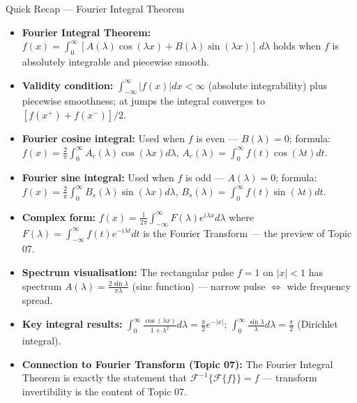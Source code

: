 \documentclass[12pt,a4paper]{article}
\begin{document}
\begin{learnbox}{Quick Recap --- Fourier Integral Theorem}
\begin{itemize}
  \item \textbf{Fourier Integral Theorem:} $f(x)=\int_0^\infty[A(\lambda)\cos(\lambda x)+B(\lambda)\sin(\lambda x)]\,d\lambda$ holds when $f$ is absolutely integrable and piecewise smooth.
  \item \textbf{Validity condition:} $\int_{-\infty}^\infty|f(x)|dx<\infty$ (absolute integrability) plus piecewise smoothness; at jumps the integral converges to $[f(x^+)+f(x^-)]/2$.
  \item \textbf{Fourier cosine integral:} Used when $f$ is even --- $B(\lambda)=0$; formula: $f(x)=\frac{2}{\pi}\int_0^\infty A_c(\lambda)\cos(\lambda x)d\lambda$, $A_c(\lambda)=\int_0^\infty f(t)\cos(\lambda t)dt$.
  \item \textbf{Fourier sine integral:} Used when $f$ is odd --- $A(\lambda)=0$; formula: $f(x)=\frac{2}{\pi}\int_0^\infty B_s(\lambda)\sin(\lambda x)d\lambda$, $B_s(\lambda)=\int_0^\infty f(t)\sin(\lambda t)dt$.
  \item \textbf{Complex form:} $f(x)=\frac{1}{2\pi}\int_{-\infty}^\infty F(\lambda)e^{i\lambda x}d\lambda$ where $F(\lambda)=\int_{-\infty}^\infty f(t)e^{-i\lambda t}dt$ is the Fourier Transform --- the preview of Topic 07.
  \item \textbf{Spectrum visualisation:} The rectangular pulse $f=1$ on $|x|<1$ has spectrum $A(\lambda)=\frac{2\sin\lambda}{\pi\lambda}$ (sinc function) --- narrow pulse $\Leftrightarrow$ wide frequency spread.
  \item \textbf{Key integral results:} $\int_0^\infty\frac{\cos(\lambda x)}{1+\lambda^2}d\lambda=\frac{\pi}{2}e^{-|x|}$; $\int_0^\infty\frac{\sin\lambda}{\lambda}d\lambda=\frac{\pi}{2}$ (Dirichlet integral).
  \item \textbf{Connection to Fourier Transform (Topic 07):} The Fourier Integral Theorem is exactly the statement that $\mathcal{F}^{-1}\{\mathcal{F}\{f\}\}=f$ --- transform invertibility is the content of Topic 07.
\end{itemize}
\end{learnbox}
\end{document}
